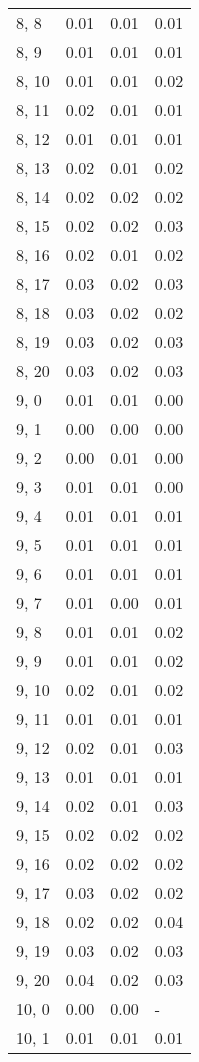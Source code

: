 \begin{table}
\begin{tabular}{llll}
8, 8   &  0.01 &  0.01 &  0.01 \\
8, 9   &  0.01 &  0.01 &  0.01 \\
8, 10  &  0.01 &  0.01 &  0.02 \\
8, 11  &  0.02 &  0.01 &  0.01 \\
8, 12  &  0.01 &  0.01 &  0.01 \\
8, 13  &  0.02 &  0.01 &  0.02 \\
8, 14  &  0.02 &  0.02 &  0.02 \\
8, 15  &  0.02 &  0.02 &  0.03 \\
8, 16  &  0.02 &  0.01 &  0.02 \\
8, 17  &  0.03 &  0.02 &  0.03 \\
8, 18  &  0.03 &  0.02 &  0.02 \\
8, 19  &  0.03 &  0.02 &  0.03 \\
8, 20  &  0.03 &  0.02 &  0.03 \\
9, 0   &  0.01 &  0.01 &  0.00 \\
9, 1   &  0.00 &  0.00 &  0.00 \\
9, 2   &  0.00 &  0.01 &  0.00 \\
9, 3   &  0.01 &  0.01 &  0.00 \\
9, 4   &  0.01 &  0.01 &  0.01 \\
9, 5   &  0.01 &  0.01 &  0.01 \\
9, 6   &  0.01 &  0.01 &  0.01 \\
9, 7   &  0.01 &  0.00 &  0.01 \\
9, 8   &  0.01 &  0.01 &  0.02 \\
9, 9   &  0.01 &  0.01 &  0.02 \\
9, 10  &  0.02 &  0.01 &  0.02 \\
9, 11  &  0.01 &  0.01 &  0.01 \\
9, 12  &  0.02 &  0.01 &  0.03 \\
9, 13  &  0.01 &  0.01 &  0.01 \\
9, 14  &  0.02 &  0.01 &  0.03 \\
9, 15  &  0.02 &  0.02 &  0.02 \\
9, 16  &  0.02 &  0.02 &  0.02 \\
9, 17  &  0.03 &  0.02 &  0.02 \\
9, 18  &  0.02 &  0.02 &  0.04 \\
9, 19  &  0.03 &  0.02 &  0.03 \\
9, 20  &  0.04 &  0.02 &  0.03 \\
10, 0  &  0.00 &  0.00 &     - \\
10, 1  &  0.01 &  0.01 &  0.01 \\

\end{tabular}
\end{table}
